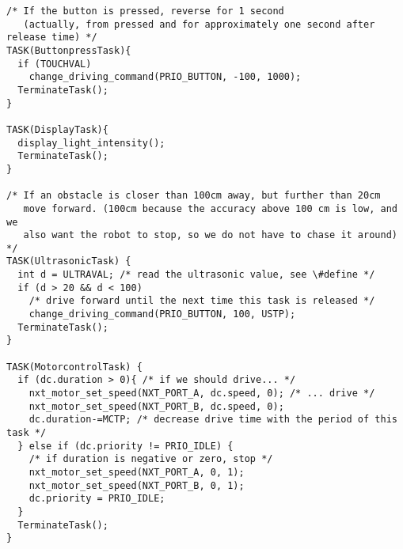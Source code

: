 \documentclass[a4paper,10pt]{report}
\begin{document}
\begin{lstlisting}[label=some-code,caption=part3.c,mathescape]
/* If the button is pressed, reverse for 1 second
   (actually, from pressed and for approximately one second after release time) */
TASK(ButtonpressTask){
  if (TOUCHVAL)
    change_driving_command(PRIO_BUTTON, -100, 1000); 		
  TerminateTask();
}

TASK(DisplayTask){
  display_light_intensity();
  TerminateTask();
}

/* If an obstacle is closer than 100cm away, but further than 20cm
   move forward. (100cm because the accuracy above 100 cm is low, and we
   also want the robot to stop, so we do not have to chase it around) */
TASK(UltrasonicTask) {
  int d = ULTRAVAL; /* read the ultrasonic value, see \#define */
  if (d > 20 && d < 100)
    /* drive forward until the next time this task is released */
    change_driving_command(PRIO_BUTTON, 100, USTP);
  TerminateTask();
}

TASK(MotorcontrolTask) {
  if (dc.duration > 0){ /* if we should drive... */
    nxt_motor_set_speed(NXT_PORT_A, dc.speed, 0); /* ... drive */
    nxt_motor_set_speed(NXT_PORT_B, dc.speed, 0);
    dc.duration-=MCTP; /* decrease drive time with the period of this task */
  } else if (dc.priority != PRIO_IDLE) { 
    /* if duration is negative or zero, stop */
    nxt_motor_set_speed(NXT_PORT_A, 0, 1);
    nxt_motor_set_speed(NXT_PORT_B, 0, 1);
    dc.priority = PRIO_IDLE;
  }
  TerminateTask();
}

\end{lstlisting}
\newpage
\end{document}
